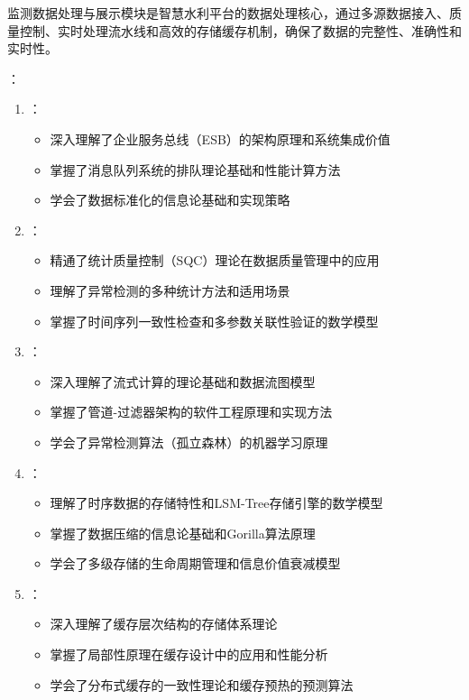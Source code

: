 监测数据处理与展示模块是智慧水利平台的数据处理核心，通过多源数据接入、质量控制、实时处理流水线和高效的存储缓存机制，确保了数据的完整性、准确性和实时性。

：

\begin{enumerate}
\def\labelenumi{\arabic{enumi}.}
\tightlist
\item
  ：

  \begin{itemize}
  \tightlist
  \item
    深入理解了企业服务总线（ESB）的架构原理和系统集成价值
  \item
    掌握了消息队列系统的排队理论基础和性能计算方法
  \item
    学会了数据标准化的信息论基础和实现策略
  \end{itemize}
\item
  ：

  \begin{itemize}
  \tightlist
  \item
    精通了统计质量控制（SQC）理论在数据质量管理中的应用
  \item
    理解了异常检测的多种统计方法和适用场景
  \item
    掌握了时间序列一致性检查和多参数关联性验证的数学模型
  \end{itemize}
\item
  ：

  \begin{itemize}
  \tightlist
  \item
    深入理解了流式计算的理论基础和数据流图模型
  \item
    掌握了管道-过滤器架构的软件工程原理和实现方法
  \item
    学会了异常检测算法（孤立森林）的机器学习原理
  \end{itemize}
\item
  ：

  \begin{itemize}
  \tightlist
  \item
    理解了时序数据的存储特性和LSM-Tree存储引擎的数学模型
  \item
    掌握了数据压缩的信息论基础和Gorilla算法原理
  \item
    学会了多级存储的生命周期管理和信息价值衰减模型
  \end{itemize}
\item
  ：

  \begin{itemize}
  \tightlist
  \item
    深入理解了缓存层次结构的存储体系理论
  \item
    掌握了局部性原理在缓存设计中的应用和性能分析
  \item
    学会了分布式缓存的一致性理论和缓存预热的预测算法
  \end{itemize}
\end{enumerate}

